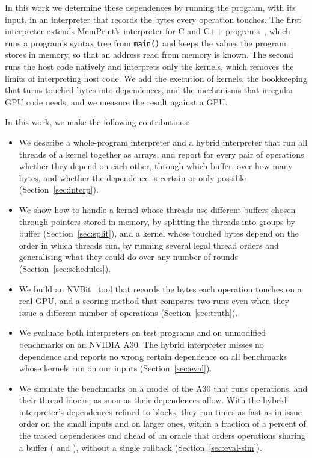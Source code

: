 \documentclass[11pt]{article}
\newcommand{\memprint}{MemPrint}
\newcommand{\secref}[1]{Section~\ref{#1}}
\newcommand{\code}[1]{\texttt{#1}}
\begin{document}
In this work we determine these dependences by running the program, with its input, in an interpreter that
records the bytes every operation touches. The first interpreter extends \memprint{}'s interpreter for C and C++
programs~\cite{memprintGeneralization}, which runs a program's syntax tree from \code{main()} and keeps the values
the program stores in memory, so that an address read from memory is known. The second runs the host code natively
and interprets only the kernels, which removes the limits of interpreting host code. We add the execution of
kernels, the bookkeeping that turns touched bytes into dependences, and the mechanisms that irregular GPU code
needs, and we measure the result against a GPU.

In this work, we make the following contributions:
\begin{itemize}
\item We describe a whole-program interpreter and a hybrid interpreter that run all threads of a kernel together as
arrays, and report for every pair of operations whether they depend on each other, through which buffer, over how
many bytes, and whether the dependence is certain or only possible (\secref{sec:interp}).
\item We show how to handle a kernel whose threads use different buffers chosen through pointers stored in
memory, by splitting the threads into groups by buffer (\secref{sec:split}), and a kernel whose touched bytes
depend on the order in which threads run, by running several legal thread orders and generalising what they could do
over any number of rounds (\secref{sec:schedules}).
\item We build an NVBit~\cite{Villa2019NVBit} tool that records the bytes each operation touches on a real GPU,
and a scoring method that compares two runs even when they issue a different number of operations
(\secref{sec:truth}).
\item We evaluate both interpreters on \numPrograms{} test programs and on \numBenchTotal{} unmodified benchmarks on
an NVIDIA A30. The hybrid interpreter misses no dependence and reports no wrong certain dependence on
all \numBenchHyDone{} benchmarks whose kernels run on our inputs (\secref{sec:eval}).
\item We simulate the benchmarks on a model of the A30 that runs operations, and their thread blocks, as soon as
their dependences allow. With the hybrid interpreter's dependences refined to blocks, they run \numSimSmallHyBlk{}
times as fast as in issue order on the small inputs and \numSimLargeHyBlk{} on larger ones, within a fraction of a
percent of the traced dependences and ahead of an oracle that orders operations sharing a buffer
(\numSimSmallBuf{} and \numSimLargeBuf{}), without a single rollback (\secref{sec:eval-sim}).
\end{itemize}
\end{document}
